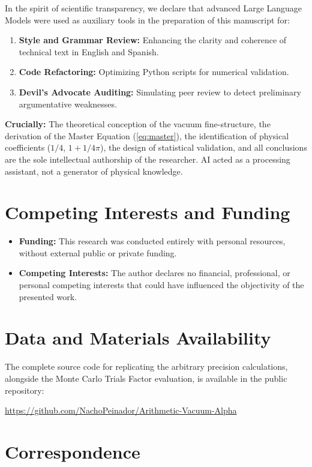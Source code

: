 \documentclass[12pt,a4paper]{article}
\begin{document}
In the spirit of scientific transparency, we declare that advanced Large Language Models were used as auxiliary tools in the preparation of this manuscript for:
\begin{enumerate}
    \item \textbf{Style and Grammar Review:} Enhancing the clarity and coherence of technical text in English and Spanish.
    \item \textbf{Code Refactoring:} Optimizing Python scripts for numerical validation.
    \item \textbf{Devil's Advocate Auditing:} Simulating peer review to detect preliminary argumentative weaknesses.
\end{enumerate}
\textbf{Crucially:} The theoretical conception of the vacuum fine-structure, the derivation of the Master Equation (\ref{eq:master}), the identification of physical coefficients ($1/4$, $1+1/4\pi$), the design of statistical validation, and all conclusions are the sole intellectual authorship of the researcher. AI acted as a processing assistant, not a generator of physical knowledge.

\section*{Competing Interests and Funding}

\begin{itemize}
    \item \textbf{Funding:} This research was conducted entirely with personal resources, without external public or private funding.
    \item \textbf{Competing Interests:} The author declares no financial, professional, or personal competing interests that could have influenced the objectivity of the presented work.
\end{itemize}

\section*{Data and Materials Availability}

The complete source code for replicating the arbitrary precision calculations, alongside the Monte Carlo Trials Factor evaluation, is available in the public repository:
\begin{center}
\url{https://github.com/NachoPeinador/Arithmetic-Vacuum-Alpha}
\end{center}

\section*{Correspondence}
\end{document}
